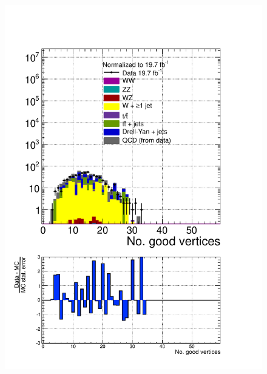 \begin{figure}[hbtp]
  \begin{center}
    \includegraphics[width=\cmsFigWidth]{figures/dataVsMCQCD_nGoodVtx_lowMT_v87}

\end{center}
\end{figure}
